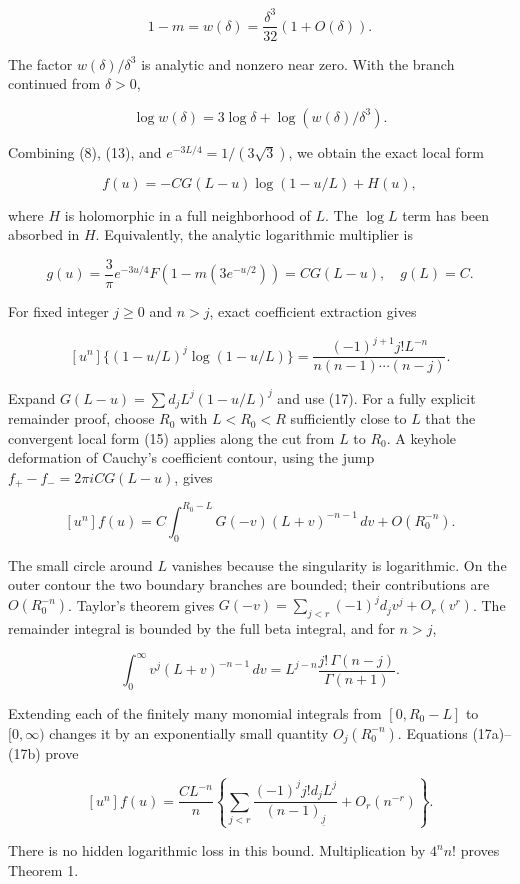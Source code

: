 \documentclass[11pt,letterpaper]{article}
\theoremstyle{remark}
\begin{document}
\[
1-m=w(\delta)=\frac{\delta^3}{32}(1+O(\delta)).
\tag{14}
\]

The factor \(w(\delta)/\delta^3\) is analytic and nonzero near zero.
With the branch continued from \(\delta>0\),

\[
\log w(\delta)=3\log\delta+\log\!\left(w(\delta)/\delta^3\right).
\]

Combining (8), (13), and \(e^{-3L/4}=1/(3\sqrt3)\), we obtain the exact
local form

\[
f(u)=-C G(L-u)\log(1-u/L)+H(u),
\tag{15}
\]

where \(H\) is holomorphic in a full neighborhood of \(L\). The
\(\log L\) term has been absorbed in \(H\). Equivalently, the analytic
logarithmic multiplier is

\[
g(u)=\frac3\pi e^{-3u/4}F(1-m(3e^{-u/2}))=C G(L-u),\quad g(L)=C.
\tag{16}
\]

For fixed integer \(j\ge0\) and \(n>j\), exact coefficient extraction
gives

\[
[u^n]\{(1-u/L)^j\log(1-u/L)\}
=\frac{(-1)^{j+1}j!L^{-n}}{n(n-1)\cdots(n-j)}.
\tag{17}
\]

Expand \(G(L-u)=\sum d_jL^j(1-u/L)^j\) and use (17). For a fully
explicit remainder proof, choose \(R_0\) with \(L<R_0<R\) sufficiently
close to \(L\) that the convergent local form (15) applies along the cut
from \(L\) to \(R_0\). A keyhole deformation of Cauchy's coefficient
contour, using the jump \(f_+-f_-=2\pi i C G(L-u)\), gives

\[
[u^n]f(u)=C\int_0^{R_0-L}G(-v)(L+v)^{-n-1}\,dv+O(R_0^{-n}).
\tag{17a}
\]

The small circle around \(L\) vanishes because the singularity is
logarithmic. On the outer contour the two boundary branches are bounded;
their contributions are \(O(R_0^{-n})\). Taylor's theorem gives
\(G(-v)=\sum_{j<r}(-1)^jd_jv^j+O_r(v^r)\). The remainder integral is
bounded by the full beta integral, and for \(n>j\),

\[
\int_0^\infty v^j(L+v)^{-n-1}\,dv
=L^{j-n}\frac{j!\,\Gamma(n-j)}{\Gamma(n+1)}.
\tag{17b}
\]

Extending each of the finitely many monomial integrals from
\([0,R_0-L]\) to \([0,\infty)\) changes it by an exponentially small
quantity \(O_j(R_0^{-n})\). Equations (17a)--(17b) prove

\[
[u^n]f(u)=\frac{CL^{-n}}n
\left\{\sum_{j<r}\frac{(-1)^jj!d_jL^j}{(n-1)_{\underline j}}+O_r(n^{-r})\right\}.
\]

There is no hidden logarithmic loss in this bound. Multiplication by
\(4^nn!\) proves Theorem 1.
\end{document}

